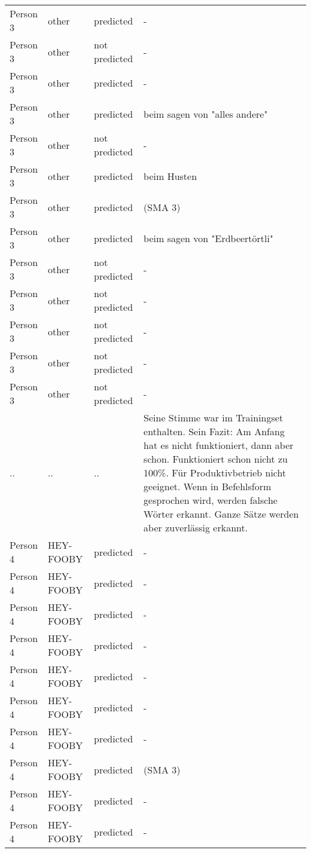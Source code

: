 \documentclass[main.tex]{subfiles} %
\begin{document}
\begin{longtable}{|p{3cm}|p{3cm}|p{3cm}|p{6cm}|}
    Person 3 & other & predicted & - \\
    Person 3 & other & not predicted & - \\
    Person 3 & other & predicted & - \\
    Person 3 & other & predicted & beim sagen von "alles andere" \\
    Person 3 & other & not predicted & - \\
    Person 3 & other & predicted & beim Husten \\
    Person 3 & other & predicted & (SMA 3) \\
    Person 3 & other & predicted & beim sagen von "Erdbeertörtli" \\
    Person 3 & other & not predicted & - \\
    Person 3 & other & not predicted & - \\
    Person 3 & other & not predicted & - \\
    Person 3 & other & not predicted & - \\
    Person 3 & other & not predicted & - \\
    .. & .. & .. & Seine Stimme war im Trainingset enthalten. Sein Fazit: Am Anfang hat es nicht 
    funktioniert, dann aber schon. Funktioniert schon nicht zu 100\%. Für Produktivbetrieb nicht 
    geeignet. Wenn in Befehlsform gesprochen wird, werden falsche Wörter erkannt. Ganze Sätze werden 
    aber zuverlässig erkannt. \\
    
    Person 4 & HEY-FOOBY & predicted & - \\
    Person 4 & HEY-FOOBY & predicted & - \\
    Person 4 & HEY-FOOBY & predicted & - \\
    Person 4 & HEY-FOOBY & predicted & - \\
    Person 4 & HEY-FOOBY & predicted & - \\
    Person 4 & HEY-FOOBY & predicted & - \\
    Person 4 & HEY-FOOBY & predicted & - \\
    Person 4 & HEY-FOOBY & predicted & (SMA 3) \\
    Person 4 & HEY-FOOBY & predicted & - \\
    Person 4 & HEY-FOOBY & predicted & - \\
    

\end{longtable}
\end{document}
